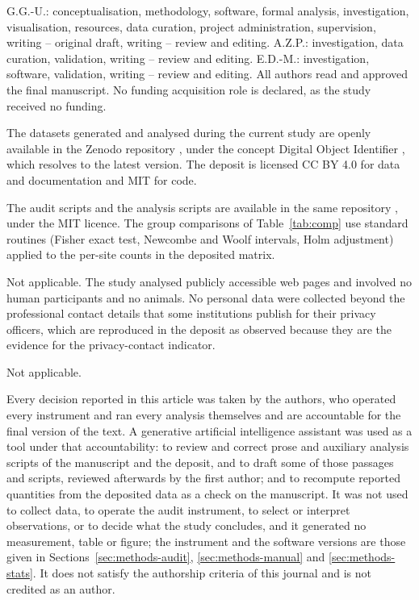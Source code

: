 \documentclass[pdflatex,sn-basic,Numbered,iicol]{sn-jnl}
\theoremstyle{thmstyleone}
\theoremstyle{thmstyletwo}
\theoremstyle{thmstylethree}
\begin{document}
G.G.-U.: conceptualisation, methodology, software, formal analysis, investigation, visualisation, resources, data curation, project administration, supervision, writing -- original draft, writing -- review and editing. A.Z.P.: investigation, data curation, validation, writing -- review and editing. E.D.-M.: investigation, software, validation, writing -- review and editing. All authors read and approved the final manuscript. No funding acquisition role is declared, as the study received no funding.

The datasets generated and analysed during the current study are openly available in the Zenodo repository \citep{deposito2026}, under the concept Digital Object Identifier , which resolves to the latest version. The deposit is licensed CC BY 4.0 for data and documentation and MIT for code.

The audit scripts and the analysis scripts are available in the same repository \citep{deposito2026}, under the MIT licence. The group comparisons of Table~\ref{tab:comp} use standard routines (Fisher exact test, Newcombe and Woolf intervals, Holm adjustment) applied to the per-site counts in the deposited matrix.

Not applicable. The study analysed publicly accessible web pages and involved no human participants and no animals. No personal data were collected beyond the professional contact details that some institutions publish for their privacy officers, which are reproduced in the deposit as observed because they are the evidence for the privacy-contact indicator.

Not applicable.

Every decision reported in this article was taken by the authors, who operated every instrument and ran every analysis themselves and are accountable for the final version of the text. A generative artificial intelligence assistant was used as a tool under that accountability: to review and correct prose and auxiliary analysis scripts of the manuscript and the deposit, and to draft some of those passages and scripts, reviewed afterwards by the first author; and to recompute reported quantities from the deposited data as a check on the manuscript. It was not used to collect data, to operate the audit instrument, to select or interpret observations, or to decide what the study concludes, and it generated no measurement, table or figure; the instrument and the software versions are those given in Sections~\ref{sec:methods-audit}, \ref{sec:methods-manual} and \ref{sec:methods-stats}. It does not satisfy the authorship criteria of this journal and is not credited as an author.
\end{document}
